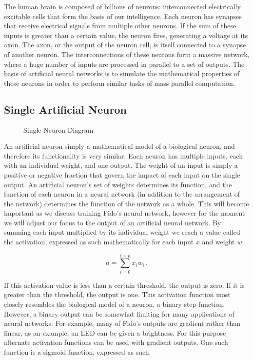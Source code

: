 The human brain is composed of billions of neurons: interconnected electrically excitable cells that form the basis of our intelligence.  Each neuron has synapses that receive electrical signals from multiple other neurons.  If the sum of these inputs is greater than a certain value, the neuron fires, generating a voltage at its axon.  The axon, or the output of the neuron cell, is itself connected to a synapse of another neuron.  The interconnections of these neurons form a massive network, where a huge number of inputs are processed in parallel to a set of outputs.  The basis of artificial neural networks is to simulate the mathematical properties of these neurons in order to perform similar tasks of mass parallel computation.


\subsection{Single Artificial Neuron}


\begin{figure}[ht]
	\centering
	
	\caption{Single Neuron Diagram}
\end{figure}

An artificial neuron simply a mathematical model of a biological neuron, and therefore its functionality is very similar.  Each neuron has multiple inputs, each with an individual weight, and one output.  The weight of an input is simply a positive or negative fraction that govern the impact of each input on the single output.  An artificial neuron's set of weights determines its function, and the function of each neuron in a neural network (in addition to the arrangement of the network) determines the function of the network as a whole.  This will become important as we discuss training Fido's neural network, however for the moment we will adjust our focus to the output of an artificial neural network.  By summing each input multiplied by its individual weight we reach a value called the activation, expressed as such mathematically for each input $x$ and weight $w$:

\begin{equation}
	a=\sum_{i=0}^{i=n}x_i w_i
	\,.
\end{equation}

If this activation value is less than a certain threshold, the output is zero.  If it is greater than the threshold, the output is one.  This activation function most closely resembles the biological model of a neuron, a binary step function.  However, a binary output can be somewhat limiting for many applications of neural networks.  For example, many of Fido's outputs are gradient rather than linear; as an example, an LED can be given a brightness.  For this purpose alternate activation functions can be used with gradient outputs.  One such function is a sigmoid function, expressed as such:

